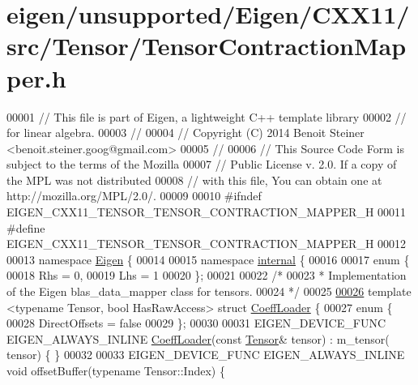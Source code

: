\hypertarget{eigen_2unsupported_2_eigen_2_c_x_x11_2src_2_tensor_2_tensor_contraction_mapper_8h_source}{}\section{eigen/unsupported/\+Eigen/\+C\+X\+X11/src/\+Tensor/\+Tensor\+Contraction\+Mapper.h}
\label{eigen_2unsupported_2_eigen_2_c_x_x11_2src_2_tensor_2_tensor_contraction_mapper_8h_source}

\begin{DoxyCode}
00001 \textcolor{comment}{// This file is part of Eigen, a lightweight C++ template library}
00002 \textcolor{comment}{// for linear algebra.}
00003 \textcolor{comment}{//}
00004 \textcolor{comment}{// Copyright (C) 2014 Benoit Steiner <benoit.steiner.goog@gmail.com>}
00005 \textcolor{comment}{//}
00006 \textcolor{comment}{// This Source Code Form is subject to the terms of the Mozilla}
00007 \textcolor{comment}{// Public License v. 2.0. If a copy of the MPL was not distributed}
00008 \textcolor{comment}{// with this file, You can obtain one at http://mozilla.org/MPL/2.0/.}
00009 
00010 \textcolor{preprocessor}{#ifndef EIGEN\_CXX11\_TENSOR\_TENSOR\_CONTRACTION\_MAPPER\_H}
00011 \textcolor{preprocessor}{#define EIGEN\_CXX11\_TENSOR\_TENSOR\_CONTRACTION\_MAPPER\_H}
00012 
00013 \textcolor{keyword}{namespace }\hyperlink{namespace_eigen}{Eigen} \{
00014 
00015 \textcolor{keyword}{namespace }\hyperlink{namespaceinternal}{internal} \{
00016 
00017 \textcolor{keyword}{enum} \{
00018   Rhs = 0,
00019   Lhs = 1
00020 \};
00021 
00022 \textcolor{comment}{/*}
00023 \textcolor{comment}{ * Implementation of the Eigen blas\_data\_mapper class for tensors.}
00024 \textcolor{comment}{ */}
00025 
\hyperlink{struct_eigen_1_1internal_1_1_coeff_loader}{00026} \textcolor{keyword}{template} <\textcolor{keyword}{typename} Tensor, \textcolor{keywordtype}{bool} HasRawAccess> \textcolor{keyword}{struct }\hyperlink{struct_eigen_1_1internal_1_1_coeff_loader}{CoeffLoader} \{
00027   \textcolor{keyword}{enum} \{
00028     DirectOffsets = \textcolor{keyword}{false}
00029   \};
00030 
00031   EIGEN\_DEVICE\_FUNC EIGEN\_ALWAYS\_INLINE \hyperlink{struct_eigen_1_1internal_1_1_coeff_loader}{CoeffLoader}(\textcolor{keyword}{const} \hyperlink{class_eigen_1_1_tensor}{Tensor}& tensor) : m\_tensor(
      tensor) \{ \}
00032 
00033   EIGEN\_DEVICE\_FUNC EIGEN\_ALWAYS\_INLINE \textcolor{keywordtype}{void} offsetBuffer(\textcolor{keyword}{typename} Tensor::Index) \{

\end{DoxyCode}
